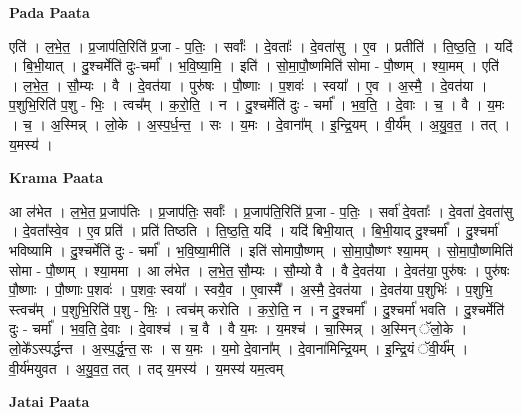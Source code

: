 \documentclass[17pt]{extarticle}
\begin{document}
\textbf{Pada Paata} \newline

एति॑ । ल॒भे॒त॒ । प्र॒जाप॑ति॒रिति॑ प्र॒जा - प॒तिः॒ । सर्वाः᳚ । दे॒वताः᳚ । दे॒वता॑सु । ए॒व । प्रतीति॑ । ति॒ष्ठ॒ति॒ । यदि॑ । बि॒भी॒यात् । दु॒श्चर्मेति॑ दुः-चर्मा᳚ । भ॒वि॒ष्या॒मि॒ । इति॑ । सो॒मा॒पौ॒ष्णमिति॑ सोमा - पौ॒ष्णम् । श्या॒मम् । एति॑ । ल॒भे॒त॒ । सौ॒म्यः । वै । दे॒वत॑या । पुरु॑षः । पौ॒ष्णाः । प॒शवः॑ । स्वया᳚ । ए॒व । अ॒स्मै॒ । दे॒वत॑या । प॒शुभि॒रिति॑ प॒शु - भिः॒ । त्वच᳚म् । क॒रो॒ति॒ । न । दु॒श्चर्मेति॑ दुः - चर्मा᳚ । भ॒व॒ति॒ । दे॒वाः । च॒ । वै । य॒मः । च॒ । अ॒स्मिन्न् । लो॒के । अ॒स्प॒र्ध॒न्त॒ । सः । य॒मः । दे॒वाना᳚म् । इ॒न्द्रि॒यम् । वी॒र्य᳚म् । अ॒यु॒व॒त॒ । तत् । य॒मस्य॑ ।  \newline


\textbf{Krama Paata} \newline

आ ल॑भेत । ल॒भे॒त॒ प्र॒जाप॑तिः । प्र॒जाप॑तिः॒ सर्वाः᳚ । प्र॒जाप॑ति॒रिति॑ प्र॒जा - प॒तिः॒ । सर्वा॑ दे॒वताः᳚ । दे॒वता॑ दे॒वता॑सु । दे॒वता᳚स्वे॒व । ए॒व प्रति॑ । प्रति॑ तिष्ठति । ति॒ष्ठ॒ति॒ यदि॑ । यदि॑ बिभी॒यात् । बि॒भी॒याद् दु॒श्चर्मा᳚ । दु॒श्चर्मा॑ भविष्यामि । दु॒श्चर्मेति॑ दुः - चर्मा᳚ । भ॒वि॒ष्या॒मीति॑ । इति॑ सोमापौ॒ष्णम् । सो॒मा॒पौ॒ष्णꣳ श्या॒मम् । सो॒मा॒पौ॒ष्णमिति॑ सोमा - पौ॒ष्णम् । श्या॒ममा । आ ल॑भेत । ल॒भे॒त॒ सौ॒म्यः । सौ॒म्यो वै । वै दे॒वत॑या । दे॒वत॑या॒ पुरु॑षः । पुरु॑षः पौ॒ष्णाः । पौ॒ष्णाः प॒शवः॑ । प॒शवः॒ स्वया᳚ । स्वयै॒व । ए॒वास्मै᳚ । अ॒स्मै॒ दे॒वत॑या । दे॒वत॑या प॒शुभिः॑ । प॒शुभि॒ स्त्वच᳚म् । प॒शुभि॒रिति॑ प॒शु - भिः॒ । त्वच॑म् करोति । क॒रो॒ति॒ न । न दु॒श्चर्मा᳚ । दु॒श्चर्मा॑ भवति । दु॒श्चर्मेति॑ दुः - चर्मा᳚ । भ॒व॒ति॒ दे॒वाः । दे॒वाश्च॑ । च॒ वै । वै य॒मः । य॒मश्च॑ । चा॒स्मिन्न् । अ॒स्मिन् ॅलो॒के । लो॒के᳚ऽस्पर्द्धन्त । अ॒स्प॒र्द्ध॒॒न्त॒ सः । स य॒मः । य॒मो दे॒वाना᳚म् । दे॒वाना॑मिन्द्रि॒यम् । इ॒न्द्रि॒यं ॅवी॒र्य᳚म् । वी॒र्य॑मयुवत । अ॒यु॒व॒त॒ तत् । तद् य॒मस्य॑ । य॒मस्य॑ यम॒त्वम् \newline

\textbf{Jatai Paata} \newline
\end{document}

